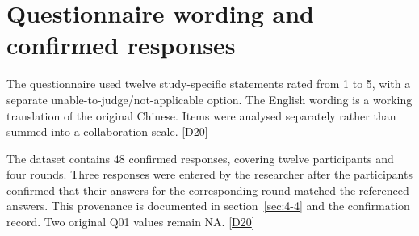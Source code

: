 \chapter{Questionnaire wording and confirmed responses}\label{chap:B}

The questionnaire used twelve study-specific statements rated from 1 to 5, with a separate unable-to-judge/not-applicable option. The English wording is a working translation of the original Chinese. Items were analysed separately rather than summed into a collaboration scale. [\hyperlink{src:D20}{D20}]

The dataset contains 48 confirmed responses, covering twelve participants and four rounds. Three responses were entered by the researcher after the participants confirmed that their answers for the corresponding round matched the referenced answers. This provenance is documented in section~\ref{sec:4-4} and the confirmation record. Two original Q01 values remain NA. [\hyperlink{src:D20}{D20}]

